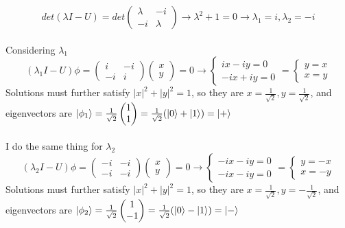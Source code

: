 \documentclass{article}
\DeclarePairedDelimiter\ket{\lvert}{\rangle}
\begin{document}
\[det(\lambda I - U)= det \left( \begin{array}{cccc} \lambda  & -i \\ -i & \lambda  \end{array} \right) \rightarrow \lambda^2 + 1 = 0 \rightarrow \lambda_1 = i, \lambda_2 =  -i\]
\\
Considering $\lambda_1$ 
\[(\lambda_1 I - U) \phi = \left( \begin{array}{cccc} i  & -i \\ -i & i \end{array} \right) \left(\begin{array}{cccc} x \\ y  \end{array}\right) = 0 \rightarrow \begin{cases} 
ix - iy =0 \\ 
-ix + iy = 0
\end{cases} =
\begin{cases} 
y = x \\ 
x = y 
\end{cases} \]
Solutions must further satisfy \(|x|^2 + |y|^2 = 1\), so they are \(x = \frac{1}{\sqrt{2}}, y = \frac{1}{\sqrt{2}}\), and eigenvectors are \(\ket{\phi_1} = \frac{1}{\sqrt{2}}\begin{pmatrix} 1 \\ 1 \end{pmatrix} = \frac{1}{\sqrt{2}}(\ket{0} + \ket{1}) = \ket{+} \)\\
\\
I do the same thing for $\lambda_2$
\[(\lambda_2 I - U) \phi = \left( \begin{array}{cccc} -i  & -i \\ -i & -i \end{array} \right) \left(\begin{array}{cccc} x \\ y  \end{array}\right) = 0 \rightarrow \begin{cases} 
-ix - iy =0 \\ 
-ix - iy = 0
\end{cases} =
\begin{cases} 
y = -x \\ 
x = -y 
\end{cases} \]
Solutions must further satisfy \(|x|^2 + |y|^2 = 1\), so they are \(x = \frac{1}{\sqrt{2}}, y = -\frac{1}{\sqrt{2}}\), and eigenvectors are \(\ket{\phi_2} = \frac{1}{\sqrt{2}}\begin{pmatrix} 1 \\ -1 \end{pmatrix} = \frac{1}{\sqrt{2}}(\ket{0} - \ket{1}) = \ket{-} \)\\
\end{document}
